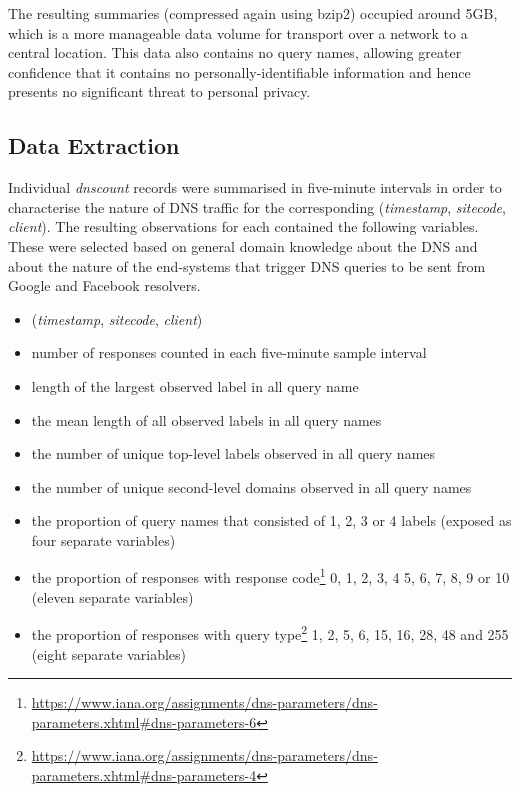 \documentclass[conference]{IEEEtran}
\let\tightlist\relax %
\begin{document}
The resulting summaries (compressed again using bzip2) occupied around
5GB, which is a more manageable data volume for transport over a network
to a central location. This data also contains no query names, allowing
greater confidence that it contains no personally-identifiable
information and hence presents no significant threat to personal
privacy.

\subsection{Data Extraction}\label{sec:data-extraction}

\label{sec:datasetextraction}

Individual \emph{dnscount} records were summarised in five-minute
intervals in order to characterise the nature of DNS traffic for the
corresponding (\emph{timestamp}, \emph{sitecode}, \emph{client}). The
resulting observations for each contained the following variables. These
were selected based on general domain knowledge about the DNS and about
the nature of the end-systems that trigger DNS queries to be sent from
Google and Facebook resolvers.

\begin{itemize}
\tightlist
\item
  (\emph{timestamp}, \emph{sitecode}, \emph{client})
\item
  number of responses counted in each five-minute sample interval
\item
  length of the largest observed label in all query name
\item
  the mean length of all observed labels in all query names
\item
  the number of unique top-level labels observed in all query names
\item
  the number of unique second-level domains observed in all query names
\item
  the proportion of query names that consisted of 1, 2, 3 or 4 labels
  (exposed as four separate variables)
\item
  the proportion of responses with response
  code\footnote{\url{https://www.iana.org/assignments/dns-parameters/dns-parameters.xhtml\#dns-parameters-6}}
  0, 1, 2, 3, 4 5, 6, 7, 8, 9 or 10 (eleven separate variables)
\item
  the proportion of responses with query
  type\footnote{\url{https://www.iana.org/assignments/dns-parameters/dns-parameters.xhtml\#dns-parameters-4}}
  1, 2, 5, 6, 15, 16, 28, 48 and 255 (eight separate variables)
\end{itemize}
\end{document}
